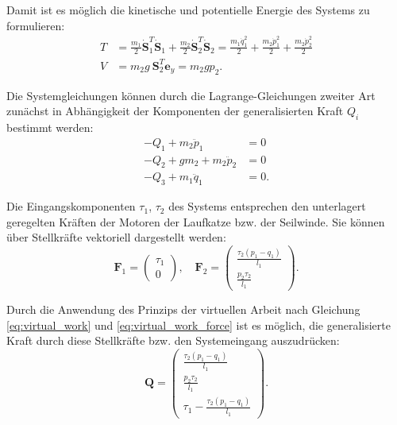 Damit ist es möglich die kinetische und potentielle Energie des Systems zu formulieren:
\begin{align}
	T &= \frac{m_1}{2} \dot{\mathbf{S}}_1^T \dot{\mathbf{S}}_1 + \frac{m_2}{2} \dot{\mathbf{S}}_2^T \dot{\mathbf{S}}_2 = \frac{m_{1} \dot{q}_{1}^{2}}{2} + \frac{m_{2} \dot{p}_{1}^{2}}{2} + \frac{m_{2} \dot{p}_{2}^{2}}{2} \\
	V &= m_2 g \ \mathbf{S}_2^T \mathbf{e}_y = m_{2} g p_{2}.
\end{align}

Die Systemgleichungen können durch die Lagrange-Gleichungen zweiter Art zunächst in Abhängigkeit der Komponenten der generalisierten Kraft $Q_i$ bestimmt werden:
\begin{subequations}
	\begin{align}
		- Q_{1} + m_{2} \ddot{p}_{1} &= 0\\
		- Q_{2} + g m_{2} + m_{2} \ddot{p}_{2} &= 0\\
		- Q_{3} + m_{1} \ddot{q}_{1} &= 0.
	\end{align}
\end{subequations}


Die Eingangskomponenten $\tau_1$, $\tau_2$ des Systems entsprechen den unterlagert geregelten Kräften der Motoren der Laufkatze bzw. der Seilwinde. Sie können über Stellkräfte vektoriell dargestellt werden:
\begin{equation}
	\mathbf{F}_1 =
	\left(\begin{matrix}
		\tau_{1} \\
		0
	\end{matrix}\right), \quad
	\mathbf{F}_2 =
	\left(\begin{matrix}
		\frac{\tau_{2} \left(p_{1} - q_{1}\right)}{l_{1}}\\
		\frac{p_{2} \tau_{2}}{l_{1}}
	\end{matrix}\right).
\end{equation}

Durch die Anwendung des Prinzips der virtuellen Arbeit nach Gleichung \eqref{eq:virtual_work} und \eqref{eq:virtual_work_force} ist es möglich, die generalisierte Kraft durch diese Stellkräfte bzw. den Systemeingang auszudrücken:
\begin{equation}
	\mathbf{Q}=
	\left(\begin{matrix}
		\frac{\tau_{2} \left(p_{1} - q_{1}\right)}{l_{1}}\\
		\frac{p_{2} \tau_{2}}{l_{1}}\\
		\tau_{1} - \frac{\tau_{2} \left(p_{1} - q_{1}\right)}{l_{1}}
	\end{matrix}\right).
\end{equation}

